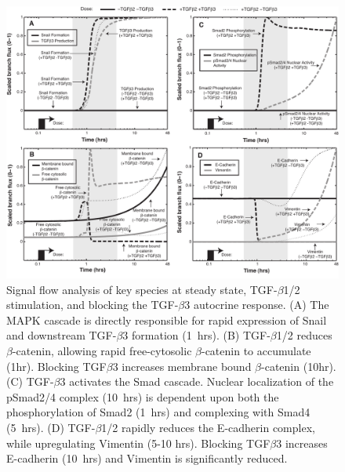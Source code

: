 \documentclass[12pt]{article}
\begin{document}
\begin{figure}
\includegraphics [width=1.0\linewidth] {./figs/Fig-1-Supplemental-FluxAnalysis.pdf}
\caption{Signal flow analysis of key species at steady state, TGF-$\beta$1/2 stimulation, and blocking the TGF-$\beta$3 autocrine response.
(A)  The MAPK cascade is directly responsible for rapid expression of Snail and downstream TGF-$\beta$3 formation (1~hrs).
(B) TGF-$\beta$1/2 reduces  $\beta$-catenin, allowing rapid free-cytosolic $\beta$-catenin to accumulate (1hr).
Blocking TGF$\beta$3 increases membrane bound $\beta$-catenin (10hr). (C)  TGF-$\beta$3 activates the Smad cascade.
Nuclear localization of the pSmad2/4 complex (10~hrs) is dependent upon both the phosphorylation of Smad2 (1~hrs) and complexing with Smad4 (5~hrs).
(D)  TGF-$\beta$1/2 rapidly reduces the E-cadherin complex, while upregulating Vimentin (5-10 hrs).
Blocking TGF$\beta$3 increases E-cadherin (10~hrs) and Vimentin is significantly reduced.}\label{fg:S1}
\end{figure}
\end{document}
